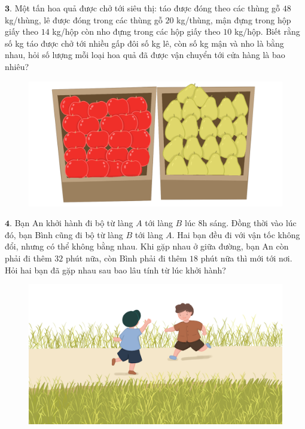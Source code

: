 \begin{multicols}{2}
\begin{figure}[H]
		\vspace*{-5pt}
	\end{figure}
	$\pmb{3.}$ Một tấn hoa quả được chở tới siêu thị: táo được đóng theo các thùng gỗ  $48$ kg/thùng, lê được đóng trong các thùng gỗ $20$ kg/thùng, mận đựng trong hộp giấy theo $14$ kg/hộp còn nho đựng trong các hộp giấy theo $10$ kg/hộp. Biết rằng số kg táo được chở tới nhiều gấp đôi số kg lê, còn số kg mận và nho là bằng nhau, hỏi số lượng mỗi loại hoa quả đã được vận chuyển tới cửa hàng là bao nhiêu?
	\begin{figure}[H]
		\centering
		\vspace*{-5pt}
		\captionsetup{labelformat= empty, justification=centering}
		\includegraphics[width=1\linewidth]{Pi3_bai3}
		\vspace*{-10pt}
	\end{figure}
	$\pmb{4.}$ Bạn An khởi hành đi bộ từ làng $A$ tới làng $B$ lúc $8$h sáng. Đồng thời vào lúc đó, bạn Bình cũng đi bộ từ làng $B$ tới làng $A$. Hai bạn đều đi với vận tốc không đổi, nhưng có thể không bằng nhau. Khi gặp nhau ở giữa đường, bạn An còn phải đi thêm $32$ phút nữa, còn Bình phải đi thêm $18$ phút nữa thì mới tới nơi. Hỏi hai bạn đã gặp nhau sau bao lâu tính từ lúc khởi hành?
	\begin{figure}[H]
		\centering
		\vspace*{-5pt}
		\captionsetup{labelformat= empty, justification=centering}
		\includegraphics[width=1\linewidth]{Pi3_bai4}

\end{figure}
\end{multicols}
